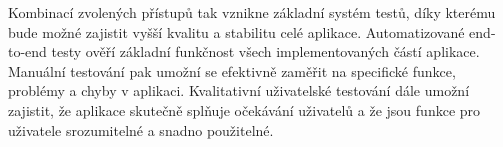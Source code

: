 Kombinací zvolených přístupů tak vznikne základní systém testů, díky kterému bude možné zajistit vyšší kvalitu a stabilitu celé aplikace. Automatizované end-to-end testy ověří základní funkčnost všech implementovaných částí aplikace. Manuální testování pak umožní se efektivně zaměřit na specifické funkce, problémy a chyby v aplikaci. Kvalitativní uživatelské testování dále umožní zajistit, že aplikace skutečně splňuje očekávání uživatelů a že jsou funkce pro uživatele srozumitelné a snadno použitelné.
